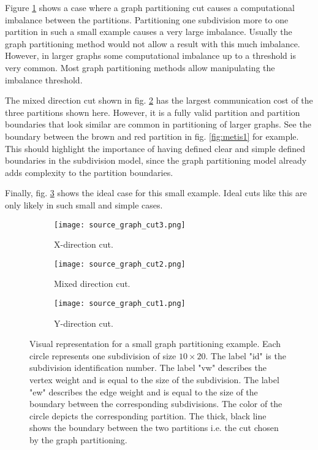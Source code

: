 Figure \ref{fig:cut1} shows a case where a graph partitioning cut causes a computational imbalance between the partitions.
Partitioning one subdivision more to one partition in such a small example causes a very large imbalance.
Usually the graph partitioning method would not allow a result with this much imbalance.
However, in larger graphs some computational imbalance up to a threshold is very common.
Most graph partitioning methods allow manipulating the imbalance threshold.

The mixed direction cut shown in fig. \ref{fig:cut2} has the largest communication cost of the three partitions shown here.
However, it is a fully valid partition and partition boundaries that look similar are common in partitioning of larger graphs.
See the boundary between the brown and red partition in fig. \ref{fig:metis1} for example.
This should highlight the importance of having defined clear and simple defined boundaries in the subdivision model, since the graph partitioning model already adds complexity to the partition boundaries.

Finally, fig. \ref{fig:cut3} shows the ideal case for this small example.
Ideal cuts like this are only likely in such small and simple cases.

\begin{figure}[!htbp]
\begin{subfigure}{0.34\textwidth}
  \texttt{[image: source\_graph\_cut3.png]}
  \caption{X-direction cut.}
  \label{fig:cut1}
\end{subfigure}%
\begin{subfigure}{0.34\textwidth}
  \texttt{[image: source\_graph\_cut2.png]}
  \caption{Mixed direction cut.}
  \label{fig:cut2}
\end{subfigure}%
\begin{subfigure}{0.34\textwidth}
  \texttt{[image: source\_graph\_cut1.png]}
  \caption{Y-direction cut.}
  \label{fig:cut3}
\end{subfigure}\hfill
\caption{Visual representation for a small graph partitioning example.
Each circle represents one subdivision of size $10 \times 20$.
The label "id" is the subdivision identification number.
The label "vw" describes the vertex weight and is equal to the size of the subdivision.
The label "ew" describes the edge weight and is equal to the size of the boundary between the corresponding subdivisions.
The color of the circle depicts the corresponding partition.
The thick, black line shows the boundary between the two partitions i.e. the cut chosen by the graph partitioning.}
\label{fig:sourcegraph}
\end{figure}

